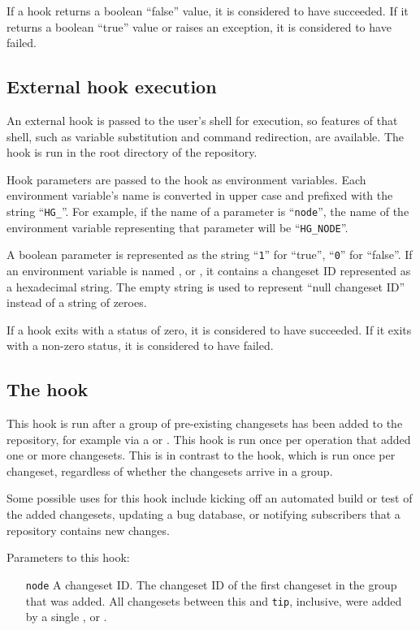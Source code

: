 If a hook returns a boolean ``false'' value, it is considered to
have succeeded.  If it returns a boolean ``true'' value or raises an
exception, it is considered to have failed.

\subsection{External hook execution}

An external hook is passed to the user's shell for execution, so
features of that shell, such as variable substitution and command
redirection, are available.  The hook is run in the root directory of
the repository.

Hook parameters are passed to the hook as environment variables.  Each
environment variable's name is converted in upper case and prefixed
with the string ``\texttt{HG\_}''.  For example, if the name of a
parameter is ``\texttt{node}'', the name of the environment variable
representing that parameter will be ``\texttt{HG\_NODE}''.

A boolean parameter is represented as the string ``\texttt{1}'' for
``true'', ``\texttt{0}'' for ``false''.  If an environment variable is
named ,  or , it
contains a changeset ID represented as a hexadecimal string.  The
empty string is used to represent ``null changeset ID'' instead of a
string of zeroes.

If a hook exits with a status of zero, it is considered to have
succeeded.  If it exits with a non-zero status, it is considered to
have failed.

\subsection{The  hook}
\label{sec:hook:changegroup}

This hook is run after a group of pre-existing changesets has been
added to the repository, for example via a  or
.  This hook is run once per operation that added one
or more changesets.  This is in contrast to the  hook,
which is run once per changeset, regardless of whether the changesets
arrive in a group.

Some possible uses for this hook include kicking off an automated
build or test of the added changesets, updating a bug database, or
notifying subscribers that a repository contains new changes.

Parameters to this hook:
\begin{itemize}
\item[\texttt{node}] A changeset ID.  The changeset ID of the first
  changeset in the group that was added.  All changesets between this
  and \texttt{tip}, inclusive, were added by
  a single ,  or .
\end{itemize}

